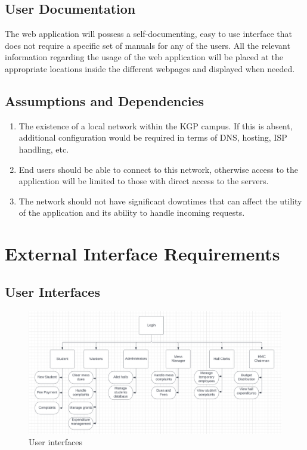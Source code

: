 \documentclass{scrreprt}
\begin{document}
\section{User Documentation}
The web application will possess a self-documenting, easy to use interface that does not require a specific set of manuals for any of the users. All the relevant information regarding the usage of the web application will be placed at the appropriate locations inside the different webpages and displayed when needed.


\section{Assumptions and Dependencies}
\begin{enumerate}
    \item The existence of a local network within the KGP campus. If this is absent, additional configuration would be required in terms of DNS, hosting, ISP handling, etc.
    \item End users should be able to connect to this network, otherwise access to the application will be limited to those with direct access to the servers. 
    \item The network should not have significant downtimes that can affect the utility of the application and its ability to handle incoming requests.
\end{enumerate}

\chapter{External Interface Requirements}

\section{User Interfaces}
\begin{figure}[h!]
    \centering
    \includegraphics[scale=0.35]{user-interface.png}
    \caption{User interfaces}
    \label{fig:ui_diag}
\end{figure}
\end{document}
